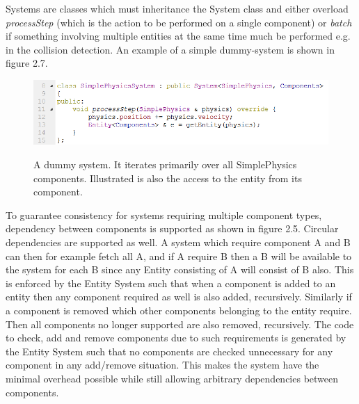 Systems are classes which must inheritance the System class and either overload \textit{processStep} (which is the action to be performed on a single component) or \textit{batch} if something involving multiple entities at the same time much be performed e.g. in the collision detection. An example of a simple dummy-system is shown in figure 2.7.
\begin{figure}[H]
  \centering
  \includegraphics[width=0.9\linewidth]{images/simplePhysicsSystem.png}
  \label{fig:SimplePhysicsSystem}
  \caption{A dummy system. It iterates primarily over all SimplePhysics components. Illustrated is also the access to the entity from its component.}
\end{figure}
To guarantee consistency for systems requiring multiple component types, dependency between components is supported as shown in figure 2.5. Circular dependencies are supported as well. A system which require component A and B can then for example fetch all A, and if A require B then a B will be available to the system for each B since any Entity consisting of A will consist of B also. This is enforced by the Entity System such that when a component is added to an entity then any component required as well is also added, recursively. Similarly if a component is removed which other components belonging to the entity require. Then all components no longer supported are also removed, recursively. The code to check, add and remove components due to such requirements is generated by the Entity System such that no components are checked unnecessary for any component in any add/remove situation. This makes the system have the minimal overhead possible while still allowing arbitrary dependencies between components. 

